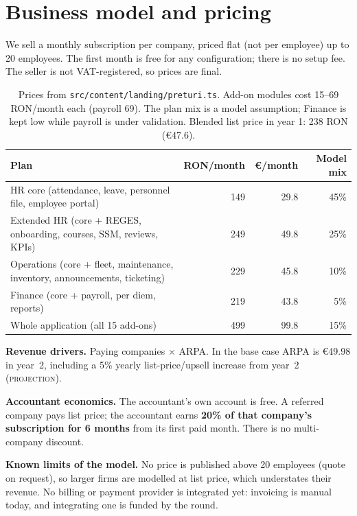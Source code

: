 \documentclass[10pt,a4paper]{article}
\newcommand{\fisier}[1]{\nolinkurl{#1}}
\newcommand{\proj}{\textcolor{brandTeal}{\textsc{projection}}}
\begin{document}
\section{Business model and pricing}

We sell a monthly subscription per company, priced flat (not per employee) up to 20 employees.
The first month is free for any configuration; there is no setup fee. The seller is not
VAT-registered, so prices are final.

\begin{table}[H]
\centering\small
\begin{tabularx}{\linewidth}{@{}Lrrr@{}}
\toprule
\textbf{Plan} & \textbf{RON/month} & \textbf{€/month} & \textbf{Model mix} \\
\midrule
HR core (attendance, leave, personnel file, employee portal) & 149 & 29.8 & 45\% \\
Extended HR (core + REGES, onboarding, courses, SSM, reviews, KPIs) & 249 & 49.8 & 25\% \\
Operations (core + fleet, maintenance, inventory, announcements, ticketing) & 229 & 45.8 & 10\% \\
Finance (core + payroll, per diem, reports) & 219 & 43.8 & 5\% \\
Whole application (all 15 add-ons) & 499 & 99.8 & 15\% \\
\bottomrule
\end{tabularx}
\caption*{\footnotesize\color{brandSlate}Prices from \fisier{src/content/landing/preturi.ts}.
Add-on modules cost 15--69 RON/month each (payroll 69). The plan mix is a model assumption; Finance
is kept low while payroll is under validation. Blended list price in year 1: 238 RON (€47.6).}
\end{table}

\textbf{Revenue drivers.} Paying companies × ARPA. In the base case ARPA is €49.98 in year~2,
including a 5\% yearly list-price/upsell increase from year~2 (\proj).

\textbf{Accountant economics.} The accountant's own account is free. A referred company pays list
price; the accountant earns \textbf{20\% of that company's subscription for 6 months} from its first
paid month. There is no multi-company discount.

\textbf{Known limits of the model.} No price is published above 20 employees (quote on request),
so larger firms are modelled at list price, which understates their revenue. No billing or payment
provider is integrated yet: invoicing is manual today, and integrating one is funded by the round.
\end{document}
